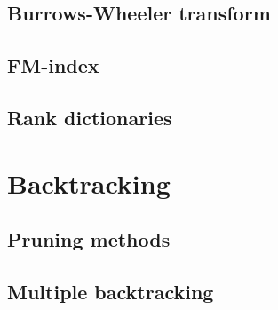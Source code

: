 \subsection{Burrows-Wheeler transform}
\subsection{FM-index}
\subsection{Rank dictionaries}
\section{Backtracking}
\subsection{Pruning methods}
\subsection{Multiple backtracking}

